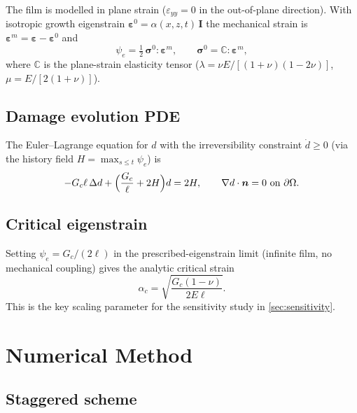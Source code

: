 \documentclass[11pt, a4paper]{article}
\newcommand{\Gc}{G_c}
\newcommand{\ac}{\alpha_c}
\newcommand{\psiE}{\psi_e}
\newcommand{\Hfield}{H}
\begin{document}
The film is modelled in plane strain ($\varepsilon_{yy} = 0$ in the
out-of-plane direction).  With isotropic growth eigenstrain
$\bm{\varepsilon}^0 = \alpha(x,z,t)\,\bm{I}$ the mechanical strain is
$\bm{\varepsilon}^m = \bm{\varepsilon} - \bm{\varepsilon}^0$ and
\begin{equation}
  \psiE = \tfrac12\,\bm{\sigma}^0 : \bm{\varepsilon}^m,
  \qquad
  \bm{\sigma}^0 = \mathbb{C} : \bm{\varepsilon}^m,
  \label{eq:psi}
\end{equation}
where $\mathbb{C}$ is the plane-strain elasticity tensor
($\lambda = \nu E / [(1+\nu)(1-2\nu)]$, $\mu = E/[2(1+\nu)]$).

\subsection{Damage evolution PDE}

The Euler--Lagrange equation for $d$ with the irreversibility constraint
$\dot{d} \ge 0$ (via the history field $\Hfield = \max_{s\le t}\psiE$) is
\begin{equation}
  -\Gc\ell\,\Delta d
  + \Bigl(\frac{\Gc}{\ell} + 2\Hfield\Bigr)d = 2\Hfield,
  \qquad
  \nabla d \cdot \bm{n} = 0 \text{ on } \partial\Omega.
  \label{eq:pde}
\end{equation}

\subsection{Critical eigenstrain}

Setting $\psiE = \Gc/(2\ell)$ in the prescribed-eigenstrain limit
(infinite film, no mechanical coupling) gives the analytic critical strain
\begin{equation}
  \ac
  = \sqrt{\frac{\Gc(1-\nu)}{2E\ell}}.
  \label{eq:alphac}
\end{equation}
This is the key scaling parameter for the sensitivity study in
\cref{sec:sensitivity}.

\section{Numerical Method}
\label{sec:method}

\subsection{Staggered scheme}
\end{document}
